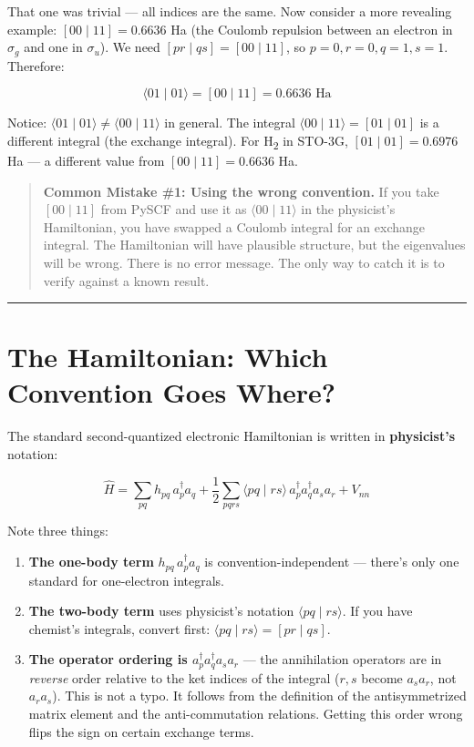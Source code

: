 \documentclass[
  11pt,
  oneside]{book}
\begin{document}
That one was trivial --- all indices are the same. Now consider a more
revealing example: \([00 \mid 11] = 0.6636\) Ha (the Coulomb repulsion
between an electron in \(\sigma_g\) and one in \(\sigma_u\)). We need
\([pr \mid qs] = [00 \mid 11]\), so \(p = 0, r = 0, q = 1, s = 1\).
Therefore:

\[\langle 01 \mid 01\rangle = [00 \mid 11] = 0.6636 \text{ Ha}\]

Notice: \(\langle 01 \mid 01\rangle \neq \langle 00 \mid 11\rangle\) in
general. The integral \(\langle 00 \mid 11\rangle = [01 \mid 01]\) is a
different integral (the exchange integral). For H\textsubscript{2} in STO-3G,
\([01 \mid 01] = 0.6976\) Ha --- a different value from
\([00 \mid 11] = 0.6636\) Ha.

\begin{quote}
\textbf{Common Mistake \#1: Using the wrong convention.} If you take
\([00 \mid 11]\) from PySCF and use it as \(\langle 00 \mid 11\rangle\)
in the physicist's Hamiltonian, you have swapped a Coulomb integral for
an exchange integral. The Hamiltonian will have plausible structure, but
the eigenvalues will be wrong. There is no error message. The only way
to catch it is to verify against a known result.
\end{quote}

\begin{center}\rule{0.5\linewidth}{0.5pt}\end{center}

\section{The Hamiltonian: Which Convention Goes
Where?}\label{the-hamiltonian-which-convention-goes-where}

The standard second-quantized electronic Hamiltonian is written in
\textbf{physicist's} notation:

\[\hat{H} = \sum_{pq} h_{pq}\, a_p^\dagger a_q + \frac{1}{2}\sum_{pqrs} \langle pq \mid rs\rangle\, a_p^\dagger a_q^\dagger a_s a_r + V_{nn}\]

Note three things:

\begin{enumerate}
\def\labelenumi{\arabic{enumi}.}
\item
  \textbf{The one-body term} \(h_{pq}\, a_p^\dagger a_q\) is
  convention-independent --- there's only one standard for one-electron
  integrals.
\item
  \textbf{The two-body term} uses physicist's notation
  \(\langle pq \mid rs\rangle\). If you have chemist's integrals,
  convert first: \(\langle pq \mid rs\rangle = [pr \mid qs]\).
\item
  \textbf{The operator ordering is \(a_p^\dagger a_q^\dagger a_s a_r\)}
  --- the annihilation operators are in \emph{reverse} order relative to
  the ket indices of the integral (\(r, s\) become \(a_s a_r\), not
  \(a_r a_s\)). This is not a typo. It follows from the definition of
  the antisymmetrized matrix element and the anti-commutation relations.
  Getting this order wrong flips the sign on certain exchange terms.
\end{enumerate}
\end{document}
